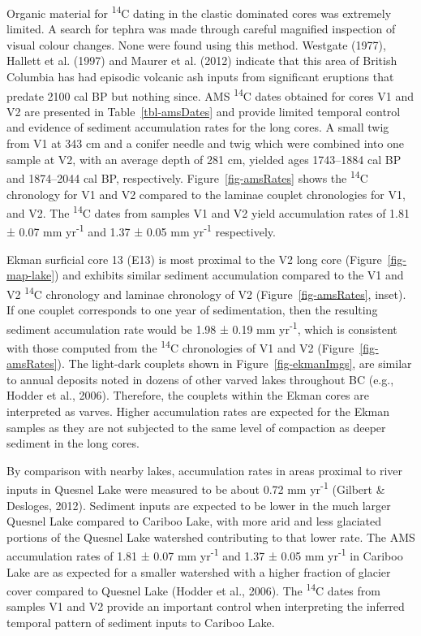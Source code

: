 \documentclass[
  letterpaper,
  DIV=11,
  numbers=noendperiod]{scrartcl}
\begin{document}
Organic material for \textsuperscript{14}C dating in the clastic
dominated cores was extremely limited. A search for tephra was made
through careful magnified inspection of visual colour changes. None were
found using this method. Westgate (1977), Hallett et al. (1997) and
Maurer et al. (2012) indicate that this area of British Columbia has had
episodic volcanic ash inputs from significant eruptions that predate
2100 cal BP but nothing since. AMS \textsuperscript{14}C dates obtained
for cores V1 and V2 are presented in Table~\ref{tbl-amsDates} and
provide limited temporal control and evidence of sediment accumulation
rates for the long cores. A small twig from V1 at 343 cm and a conifer
needle and twig which were combined into one sample at V2, with an
average depth of 281 cm, yielded ages 1743--1884 cal BP and 1874--2044
cal BP, respectively. Figure~\ref{fig-amsRates} shows the
\textsuperscript{14}C chronology for V1 and V2 compared to the laminae
couplet chronologies for V1, and V2. The \textsuperscript{14}C dates
from samples V1 and V2 yield accumulation rates of 1.81 ± 0.07 mm
yr\textsuperscript{-1} and 1.37 ± 0.05 mm yr\textsuperscript{-1}
respectively.

Ekman surficial core 13 (E13) is most proximal to the V2 long core
(Figure~\ref{fig-map-lake}) and exhibits similar sediment accumulation
compared to the V1 and V2 \textsuperscript{14}C chronology and laminae
chronology of V2 (Figure~\ref{fig-amsRates}, inset). If one couplet
corresponds to one year of sedimentation, then the resulting sediment
accumulation rate would be 1.98 ± 0.19 mm yr\textsuperscript{-1}, which
is consistent with those computed from the \textsuperscript{14}C
chronologies of V1 and V2 (Figure~\ref{fig-amsRates}). The light-dark
couplets shown in Figure~\ref{fig-ekmanImgs}, are similar to annual
deposits noted in dozens of other varved lakes throughout BC (e.g.,
Hodder et al., 2006). Therefore, the couplets within the Ekman cores are
interpreted as varves. Higher accumulation rates are expected for the
Ekman samples as they are not subjected to the same level of compaction
as deeper sediment in the long cores.

By comparison with nearby lakes, accumulation rates in areas proximal to
river inputs in Quesnel Lake were measured to be about 0.72 mm
yr\textsuperscript{-1} (Gilbert \& Desloges, 2012). Sediment inputs are
expected to be lower in the much larger Quesnel Lake compared to Cariboo
Lake, with more arid and less glaciated portions of the Quesnel Lake
watershed contributing to that lower rate. The AMS accumulation rates of
1.81 ± 0.07 mm yr\textsuperscript{-1} and 1.37 ± 0.05 mm
yr\textsuperscript{-1} in Cariboo Lake are as expected for a smaller
watershed with a higher fraction of glacier cover compared to Quesnel
Lake (Hodder et al., 2006). The \textsuperscript{14}C dates from samples
V1 and V2 provide an important control when interpreting the inferred
temporal pattern of sediment inputs to Cariboo Lake.
\end{document}
